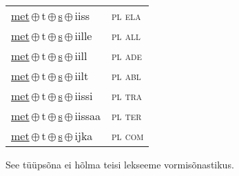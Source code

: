 \begin{minipage}{\textwidth}
\begin{sideways}
\begin{tabular}{l l}
\underline{met}\,$\oplus$\,t\,$\oplus$\,\underline{s}\,$\oplus$\,iiss & \textsc{ pl ela } \\
\underline{met}\,$\oplus$\,t\,$\oplus$\,\underline{s}\,$\oplus$\,iille & \textsc{ pl all } \\
\underline{met}\,$\oplus$\,t\,$\oplus$\,\underline{s}\,$\oplus$\,iill & \textsc{ pl ade } \\
\underline{met}\,$\oplus$\,t\,$\oplus$\,\underline{s}\,$\oplus$\,iilt & \textsc{ pl abl } \\
\underline{met}\,$\oplus$\,t\,$\oplus$\,\underline{s}\,$\oplus$\,iissi & \textsc{ pl tra } \\
\underline{met}\,$\oplus$\,t\,$\oplus$\,\underline{s}\,$\oplus$\,iissaa & \textsc{ pl ter } \\
\underline{met}\,$\oplus$\,t\,$\oplus$\,\underline{s}\,$\oplus$\,ijka & \textsc{ pl com } \\
\end{tabular}
\end{sideways}
\label{tab:tüüpsõnamall-mettse}

\end{minipage}

 
\vspace{1em}
\noindent See tüüpsõna ei hõlma teisi lekseeme vormi\-sõnastikus.
